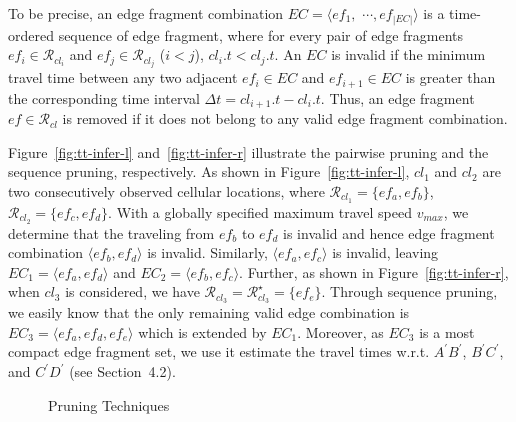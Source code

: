 \documentclass{vldb}
\begin{document}
	To be precise, an edge fragment combination $EC=\langle ef_1, $ $\cdots, ef_{|EC|}\rangle$ is a time-ordered sequence of edge fragment, where for every pair of edge fragments $ef_i\in\mathcal{R}_{cl_i}$ and $ef_j\in\mathcal{R}_{cl_j}$ ($i<j$), $cl_i.t<cl_j.t$.
	An $EC$ is invalid if the minimum travel time between  any two adjacent $ef_i\in EC$ and $ef_{i+1}\in EC$ is greater than the corresponding time interval $\Delta t=cl_{i+1}.t-cl_i.t$. %
	Thus, an edge fragment $ef\in \mathcal{R}_{cl}$ is removed if it does not belong to any valid edge fragment combination.
	
	Figure~\ref{fig:tt-infer-l} and~\ref{fig:tt-infer-r} illustrate the pairwise pruning and the sequence pruning, respectively.
	As shown in Figure~\ref{fig:tt-infer-l}, $cl_1$ and $cl_2$ are two consecutively observed cellular locations, 
	where $\mathcal{R}_{cl_1}=\{ ef_a, ef_b\}$, $\mathcal{R}_{cl_2}=\{ ef_c, ef_d\}$.
	With a globally specified maximum travel speed $v_{max}$, we determine that the traveling from $ef_{b}$ to $ef_{d}$ is invalid %
	and hence edge fragment combination $\langle ef_b, ef_d\rangle$ is invalid. 
	Similarly, $\langle ef_a, ef_c\rangle$ is invalid, leaving $EC_1=\langle ef_a, ef_d\rangle$ and $EC_2=\langle ef_b, ef_c\rangle$.
	Further, as shown in Figure~\ref{fig:tt-infer-r}, when $cl_3$ is considered, we have $\mathcal{R}_{cl_3}=\mathcal{R}_{cl_3}^\star=\{ef_e \}$.
	Through sequence pruning, we easily know that the only remaining valid edge combination is $EC_3=\langle ef_a, ef_d, ef_e \rangle$ which is extended by $EC_1$. 
	Moreover, as $EC_3$ is a most compact edge fragment set, we use it estimate the travel times w.r.t. $A^\prime B^\prime$, $B^\prime C^\prime$, and $C^\prime D^\prime$ (see Section~4.2).
	
	
	\begin{figure}[!htb]
		\centering
		\vspace{-10pt}
		\vspace{-10pt}
		\caption{Pruning Techniques}
		\vspace{-10pt}
		\label{fig:tt-infer}  %
	\end{figure}
		
\end{document}
